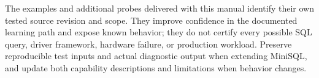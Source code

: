 The examples and additional probes delivered with this manual identify their own tested source revision and scope. They improve confidence in the documented learning path and expose known behavior; they do not certify every possible SQL query, driver framework, hardware failure, or production workload. Preserve reproducible test inputs and actual diagnostic output when extending MiniSQL, and update both capability descriptions and limitations when behavior changes.


